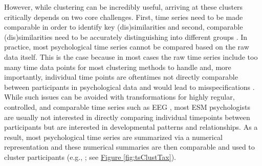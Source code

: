 \documentclass[man, 12pt, a4paper, mask, floatsintext]{apa7}
\theoremstyle{break}
\theoremstyle{plain}
\newcommand{\fgrref}[2][]{\hyperref[#2]{Figure \ref*{#2}#1}}
\begin{document}


However, while clustering can be incredibly useful, arriving at these clusters critically depends on two core challenges. First, time series need to be made comparable in order to identify key (dis)similarities and second, comparable (dis)similarities need to be accurately distinguishing into different groups \citep[e.g.,][]{Aghabozorgi2015}. In practice, most psychological time series cannot be compared based on the raw data itself. This is the case because in most cases the raw time series include too many time data points for most clustering methods to handle \citep[e.g.,][]{altman2018} and, more importantly, individual time points are oftentimes not directly comparable between participants in psychological data and would lead to misspecifications \citep[e.g., ][]{faloutsos1994}. While such issues can be avoided with transformations for highly regular, controlled, and comparable time series such as EEG \citep[e.g.,][]{huang1985}, most ESM psychologists are usually not interested in directly comparing individual timepoints between participants but are interested in developmental patterns and relationships. As a result, most psychological time series are summarized via a numerical representation and these numerical summaries are then comparable and used to cluster participants (e.g., \citealp[]{liao2005}; see \fgrref{fig:tsClustTax}).
\end{document}
